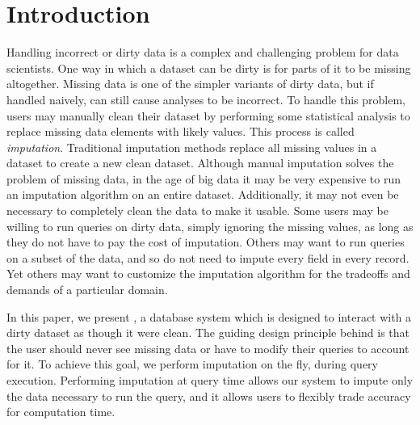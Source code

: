 \section{Introduction}

Handling incorrect or dirty data is a complex and challenging problem for data scientists.
One way in which a dataset can be dirty is for parts of it to be missing altogether.
Missing data is one of the simpler variants of dirty data, but if handled naively, can still cause analyses to be incorrect.
To handle this problem, users may manually clean their dataset by performing
some statistical analysis to replace missing data elements with likely values.
This process is called \emph{imputation}.
Traditional imputation methods replace all missing values in a dataset to create a new clean dataset.
Although manual imputation solves the problem of missing data, in the age of big data it may be very expensive to run an imputation algorithm on an entire dataset.
Additionally, it may not even be necessary to completely clean the data to make it usable.
Some users may be willing to run queries on dirty data, simply ignoring the missing values, as long as they do not have to pay the cost of imputation.
Others may want to run queries on a subset of the data, and so do not need to impute
every field in every record. Yet others may want to customize the 
imputation algorithm for the tradeoffs and demands of a particular domain.

In this paper, we present \ProjectName{}, a database system which is designed to interact with a dirty dataset as though it were clean.
The guiding design principle behind \ProjectName{} is that the user should never see missing data or have to modify their queries to account for it.
To achieve this goal, we perform imputation on the fly, during query execution.
Performing imputation at query time allows our system to impute only the data necessary to run the query, and it allows users to flexibly trade accuracy for computation time.

